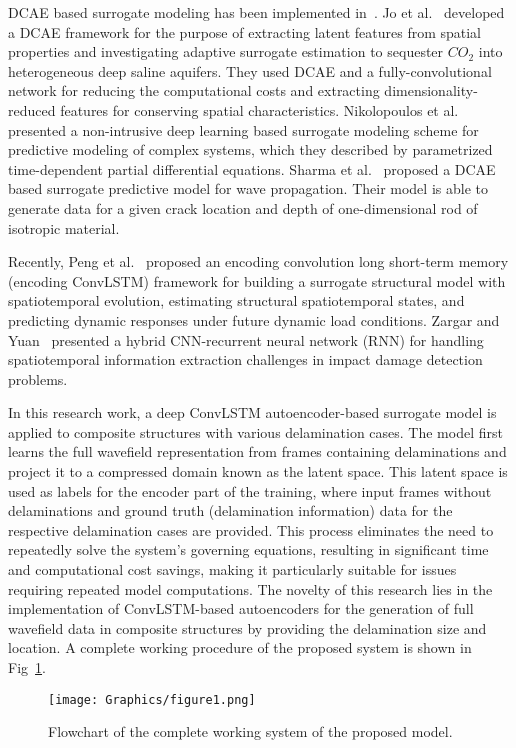 DCAE based surrogate modeling has been implemented in~\cite{jo2021adaptive, 
	nikolopoulos2022non, sharma2022wave}. 
Jo et al.~\cite{jo2021adaptive} developed a DCAE framework for the purpose of  
extracting latent features from spatial properties and investigating adaptive 
surrogate estimation to sequester $CO_2$ into heterogeneous deep saline 
aquifers. 
They used DCAE and a fully-convolutional network for reducing the
computational costs and extracting dimensionality-reduced features for  
conserving spatial characteristics. 
Nikolopoulos et al.~\cite{nikolopoulos2022non} presented a non-intrusive 
deep learning based surrogate modeling scheme for predictive modeling of 
complex systems, which they described by parametrized time-dependent partial 
differential equations. 
Sharma et al.~\cite{sharma2022wave} proposed a DCAE based surrogate predictive 
model for wave propagation. 
Their model is able to generate data for a given crack location and depth
of one-dimensional rod of isotropic material.

Recently, Peng et al.~\cite{peng2021structural} proposed an encoding 
convolution long short-term memory (encoding ConvLSTM) framework for building a 
surrogate structural model with spatiotemporal evolution, estimating structural 
spatiotemporal states, and predicting dynamic responses under future dynamic 
load conditions. Zargar and Yuan~\cite{zargar2021impact} presented a hybrid 
CNN-recurrent neural network (RNN) for handling spatiotemporal information 
extraction challenges in impact damage detection problems.

In this research work, a deep ConvLSTM autoencoder-based surrogate model is 
applied to composite structures with various delamination cases. The model 
first learns the full wavefield representation from frames containing 
delaminations and project it to a compressed domain known as the latent space. 
This latent space is used as labels for the encoder part of the training, where 
input frames without delaminations and ground truth (delamination information) 
data for the respective delamination cases are provided.
This process eliminates the need to repeatedly solve the system's governing 
equations, resulting in significant time and computational cost savings, making 
it particularly suitable for issues requiring repeated model computations. 
The novelty of this research lies in the implementation of ConvLSTM-based 
autoencoders for the generation of full wavefield data in composite 
structures by providing the delamination size and location.
A complete working procedure of the proposed system is shown in 
Fig~\ref{fig:complete_flowchart}.
\begin{figure} [h!]
	\begin{center}
		\texttt{[image: Graphics/figure1.png]}
	\end{center}
	\caption{Flowchart of the complete working system of the proposed model.} 
	\label{fig:complete_flowchart}
\end{figure}

